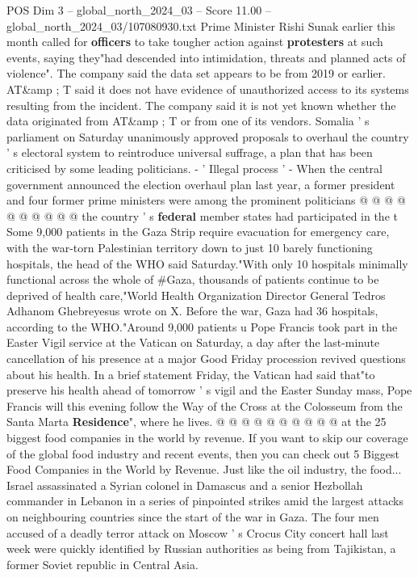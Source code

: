 \begin{textsample}{POS Dim 3 – global\_north\_2024\_03 – Score 11.00 – global\_north\_2024\_03/107080930.txt}
Prime Minister Rishi Sunak earlier this month called for \textbf{officers} to take tougher action against \textbf{protesters} at such events, saying they"had descended into intimidation, threats and planned acts of violence".
The company said the data set appears to be from 2019 or earlier.
AT\&amp ; T said it does not have evidence of unauthorized access to its systems resulting from the incident.
The company said it is not yet known whether the data originated from AT\&amp ; T or from one of its vendors.
Somalia ' s parliament on Saturday unanimously approved proposals to overhaul the country ' s electoral system to reintroduce universal suffrage, a plan that has been criticised by some leading politicians. - ' Illegal process ' - When the central government announced the election overhaul plan last year, a former president and four former prime ministers were among the prominent politicians @ @ @ @ @ @ @ @ @ @ the country ' s \textbf{federal} member states had participated in the t Some 9,000 patients in the Gaza Strip require evacuation for emergency care, with the war-torn Palestinian territory down to just 10 barely functioning hospitals, the head of the WHO said Saturday."With only 10 hospitals minimally functional across the whole of \#Gaza, thousands of patients continue to be deprived of health care,"World Health Organization Director General Tedros Adhanom Ghebreyesus wrote on X.
Before the war, Gaza had 36 hospitals, according to the WHO."Around 9,000 patients u Pope Francis took part in the Easter Vigil service at the Vatican on Saturday, a day after the last-minute cancellation of his presence at a major Good Friday procession revived questions about his health.
In a brief statement Friday, the Vatican had said that"to preserve his health ahead of tomorrow ' s vigil and the Easter Sunday mass, Pope Francis will this evening follow the Way of the Cross at the Colosseum from the Santa Marta \textbf{Residence}", where he lives. @ @ @ @ @ @ @ @ @ @ at the 25 biggest food companies in the world by revenue.
If you want to skip our coverage of the global food industry and recent events, then you can check out 5 Biggest Food Companies in the World by Revenue.
Just like the oil industry, the food...
Israel assassinated a Syrian colonel in Damascus and a senior Hezbollah commander in Lebanon in a series of pinpointed strikes amid the largest attacks on neighbouring countries since the start of the war in Gaza.
The four men accused of a deadly terror attack on Moscow ' s Crocus City concert hall last week were quickly identified by Russian authorities as being from Tajikistan, a former Soviet republic in Central Asia.

\end{textsample}
